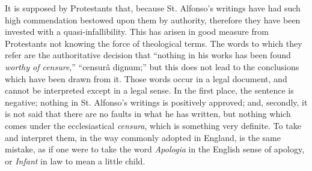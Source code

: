 It is supposed by Protestants that, because St. Alfonso's writings
have had such high commendation bestowed upon them by authority,
therefore they have been invested with a quasi-infallibility. This has
arisen in good measure from Protestants not knowing the force of
theological terms. The words to which they refer are the authoritative
decision that ``nothing in his works has been found \emph{worthy of
censure},'' ``censurâ dignum;'' but this does not lead
to the conclusions which have been drawn from it. Those words occur in a
legal document, and cannot be interpreted except in a legal sense. In
the first place, the sentence is negative; nothing in St. Alfonso's
writings is positively approved; and, secondly, it is not said that there
are no faults in what he has written, but nothing which comes under the
ecclesiastical \emph{censura}, which is something very definite. To take
and interpret them, in the way commonly adopted in England, is the same
mistake, as if one were to take the word \emph{Apologia} in the
English sense of apology, or \emph{Infant} in law to mean a little
child.

